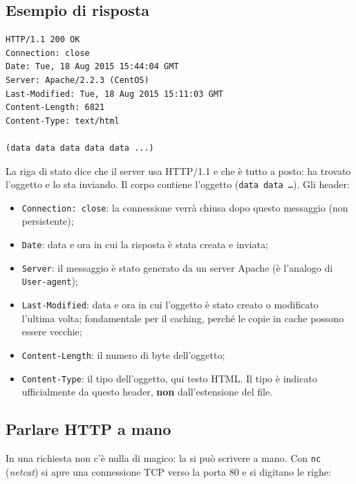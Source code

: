 
\subsection{Esempio di risposta}

\begin{lstlisting}[language=http, title={Risposta HTTP}]
HTTP/1.1 200 OK
Connection: close
Date: Tue, 18 Aug 2015 15:44:04 GMT
Server: Apache/2.2.3 (CentOS)
Last-Modified: Tue, 18 Aug 2015 15:11:03 GMT
Content-Length: 6821
Content-Type: text/html

(data data data data data ...)
\end{lstlisting}

La riga di stato dice che il server usa HTTP/1.1 e che è tutto a posto: ha trovato l'oggetto e lo sta
inviando. Il corpo contiene l'oggetto (\texttt{data data \dots}). Gli header:

\begin{itemize}
    \item \texttt{Connection: close}: la connessione verrà chiusa dopo questo messaggio (non persistente);
    \item \texttt{Date}: data e ora in cui la risposta è stata creata e inviata;
    \item \texttt{Server}: il messaggio è stato generato da un server Apache (è l'analogo di \texttt{User-agent});
    \item \texttt{Last-Modified}: data e ora in cui l'oggetto è stato creato o modificato l'ultima volta;
          fondamentale per il caching, perché le copie in cache possono essere vecchie;
    \item \texttt{Content-Length}: il numero di byte dell'oggetto;
    \item \texttt{Content-Type}: il tipo dell'oggetto, qui testo HTML. Il tipo è indicato ufficialmente da
          questo header, \textbf{non} dall'estensione del file.
\end{itemize}

\subsection{Parlare HTTP a mano}

In una richiesta non c'è nulla di magico: la si può scrivere a mano. Con \texttt{nc} (\emph{netcat}) si apre una
connessione TCP verso la porta 80 e si digitano le righe:

